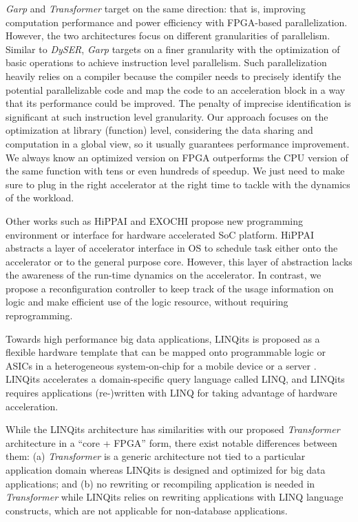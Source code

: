 {\em Garp} \cite{Garp:1997,Garp:2000} and {\em Transformer} target on
the same direction: that is, improving computation performance and power
efficiency with FPGA-based parallelization. However, the two
architectures focus on different granularities of parallelism. Similar
to {\em DySER}, {\em Garp} targets on a finer granularity with the
optimization of basic operations to achieve instruction level
parallelism. Such parallelization heavily relies on a compiler because the compiler needs to
precisely identify the potential parallelizable code and map the code
to an acceleration block in a way that its performance could be
improved. The penalty of imprecise identification is significant at such instruction level granularity.
Our approach focuses on the optimization at library (function) level,
considering the data sharing and computation in a global
view, so it usually guarantees performance improvement. We always know
an optimized version on FPGA outperforms the CPU version of the same
function with tens or even hundreds of speedup. We just need to make
sure to plug in the right accelerator at the right time to tackle with
the dynamics of the workload. 

Other works such as HiPPAI \cite{Stillwell:2009if} and EXOCHI
\cite{Wang:2007bc} propose new programming environment or interface
for hardware accelerated SoC platform. HiPPAI abstracts a layer of
accelerator interface in OS to schedule task either onto the
accelerator or to the general purpose core. However, this layer of
abstraction lacks the awareness of the run-time dynamics on the
accelerator. In contrast, we propose a reconfiguration controller to
keep track of the usage information on logic and make 
efficient use of the logic resource, without requiring reprogramming. 

Towards high performance big data applications, LINQits is proposed as
a flexible hardware template that can be mapped onto programmable
logic or ASICs in a heterogeneous system-on-chip for a mobile device
or a server \cite{Chung:2013:LBD:2485922.2485945}. LINQits accelerates a domain-specific query
language called LINQ, and LINQits requires applications (re-)written with
LINQ for taking advantage of hardware acceleration. 

While the LINQits architecture has similarities with our proposed {\em
  Transformer} architecture in a ``core + FPGA'' form, there exist
notable differences between them: (a) {\em Transformer} is a
generic architecture not tied to a particular application domain
whereas LINQits is designed and optimized for big data applications; 
and (b) no rewriting or recompiling application is needed in {\em Transformer} while
LINQits relies on rewriting applications with LINQ language
constructs, which are not applicable for non-database applications.

